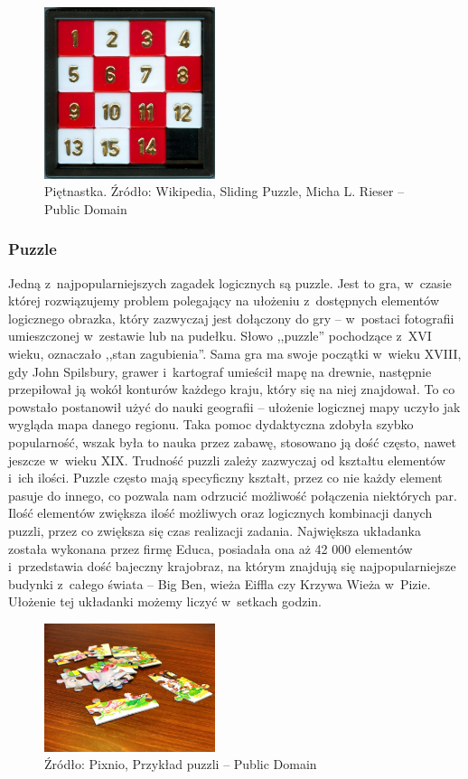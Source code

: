 \documentclass[oneside,polski,logo]{amuthesis}
\begin{document}
\begin{figure}[h]
\centering
\includegraphics[width=5cm]{images/tyrek/przesuwane-puzzle.jpg}
\caption{Piętnastka. Źródło: Wikipedia, Sliding Puzzle, Micha L. Rieser – Public Domain}
\end{figure}

\subsubsection{Puzzle}
\par Jedną z~najpopularniejszych zagadek logicznych są puzzle. Jest to gra, w~czasie której rozwiązujemy problem polegający na ułożeniu z~dostępnych elementów logicznego obrazka, który zazwyczaj jest dołączony do gry – w~postaci fotografii umieszczonej w~zestawie lub na pudełku.
Słowo ,,puzzle'' pochodzące z~XVI wieku, oznaczało ,,stan zagubienia''. Sama gra ma swoje początki w~wieku XVIII, gdy John Spilsbury, grawer i~kartograf umieścił mapę na drewnie, następnie przepiłował ją wokół konturów każdego kraju, który się na niej znajdował. To co powstało postanowił użyć do nauki geografii – ułożenie logicznej mapy uczyło jak wygląda mapa danego regionu. Taka pomoc dydaktyczna zdobyła szybko popularność, wszak była to nauka przez zabawę, stosowano ją dość często, nawet jeszcze w~wieku XIX.  
Trudność puzzli zależy zazwyczaj od kształtu elementów i~ich ilości. Puzzle często mają specyficzny kształt, przez co nie każdy element pasuje do innego, co pozwala nam odrzucić możliwość połączenia niektórych par. Ilość elementów zwiększa ilość możliwych oraz logicznych kombinacji danych puzzli, przez co zwiększa się czas realizacji zadania. Największa układanka została wykonana przez firmę Educa, posiadała ona aż 42 000 elementów i~przedstawia dość bajeczny krajobraz, na którym znajdują się najpopularniejsze budynki z~całego świata – Big Ben, wieża Eiffla czy Krzywa Wieża w~Pizie. Ułożenie tej układanki możemy liczyć w~setkach godzin. \cite{puzzle}

\begin{figure}[h]
\centering
\includegraphics[width=5cm]{images/tyrek/puzzle.jpg}
\caption{Źródło: Pixnio, Przykład puzzli – Public Domain}
\end{figure}
\end{document}
